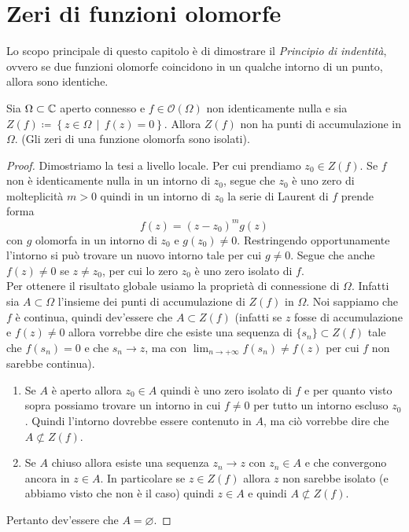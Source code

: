 \def \ord {\operatorname{ord}}

\chapter{Zeri di funzioni olomorfe}

Lo scopo principale di questo capitolo è di dimostrare il \emph{Principio di
indentità}, ovvero se due funzioni olomorfe coincidono in un qualche intorno di
un punto, allora sono identiche.

\begin{theorem}
   \label{thr:zeri_di_funz_no_accum}
  Sia $\Omega \subset \mathbb{C}$ aperto connesso e $f\in \mathcal{O}(\Omega)$ non
  identicamente nulla e sia $Z(f) \coloneqq \left\{ z \in \Omega \,\middle|\,
  f(z) = 0 \right\}$. Allora  $Z(f)$ non ha punti di accumulazione in $\Omega$.
  (Gli zeri di una funzione olomorfa sono isolati).
\end{theorem}
\begin{proof}
    Dimostriamo la tesi a livello locale. Per cui prendiamo $z_0 \in Z(f)$. Se
    $f$ non è identicamente nulla in un intorno di $z_0$, segue che $z_0$ è uno
    zero di molteplicità $m > 0$ quindi in un intorno di $z_0$ la serie di
    Laurent di $f$ prende forma
    \begin{equation*}
      f(z) = (z-z_0)^m g(z)
    \end{equation*}
    con $g$ olomorfa in un intorno di $z_0$ e $g(z_0) \neq 0$.
    Restringendo opportunamente l'intorno si può trovare un nuovo intorno tale
    per cui $g \neq 0$. Segue che anche $f(z) \neq 0$ se $z \neq z_0$, per cui
    lo zero $z_0$ è uno zero isolato di $f$.\\

    Per ottenere il risultato globale usiamo la proprietà di connessione di
    $\Omega$. Infatti sia $A \subset \Omega$ l'insieme dei punti di
    accumulazione di $Z(f)$ in $\Omega$. Noi sappiamo che $f$ è continua, quindi
    dev'essere che $A \subset Z(f)$ (infatti se $z$ fosse di accumulazione
      e $f(z) \neq 0$ allora vorrebbe dire che esiste una sequenza di $\{s_n\}
    \subset Z(f)$ tale che $f(s_n) = 0$ e che $s_n \to z$, ma con 
    $\lim_{n\to+\infty} f(s_n) \neq f(z)$ per cui $f$ non sarebbe continua).
    \begin{enumerate}
    	\item Se $A$ è aperto allora $z_0 \in A$ quindi è uno zero isolato
    	di $f$ e per quanto visto sopra possiamo trovare un intorno in cui $f \neq
    	0$ per tutto un intorno escluso $z_0$. Quindi l'intorno dovrebbe essere
    	contenuto in $A$, ma ciò vorrebbe dire che $A \not\subset Z(f)$. 
    	\item Se $A$ chiuso allora esiste una sequenza $z_n \to z$ con $z_n \in A$ e che
    	convergono ancora in $z \in A$. In particolare se $z \in Z(f)$ allora $z$
    	non sarebbe isolato (e abbiamo visto che non è il caso) quindi $z \in A$
    	e quindi $A \not\subset Z(f)$.
    \end{enumerate}
  Pertanto dev'essere che $A = \varnothing$.
\end{proof}

